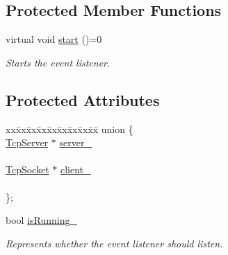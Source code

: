 \subsection*{Protected Member Functions}
\begin{DoxyCompactItemize}
\item 
\mbox{\label{class_tcp_event_listener_a900e4938c19ae2371c4621e5c9d46730}} 
virtual void \mbox{\hyperlink{class_tcp_event_listener_a900e4938c19ae2371c4621e5c9d46730}{start}} ()=0
\begin{DoxyCompactList}\small\item\em Starts the event listener. \end{DoxyCompactList}\end{DoxyCompactItemize}
\subsection*{Protected Attributes}
\begin{DoxyCompactItemize}
\item 
\mbox{\label{class_tcp_event_listener_a2d916c707cc58771608ffdc8ae9dfa13}} 
\begin{tabbing}
xx\=xx\=xx\=xx\=xx\=xx\=xx\=xx\=xx\=\kill
union \{\\
\>\mbox{\hyperlink{class_tcp_server}{TcpServer}} $\ast$ \mbox{\hyperlink{class_tcp_event_listener_ab8e2c46397bc14530531bff274c9d3f1}{server\_}}\\
\>\\
\>\mbox{\hyperlink{class_tcp_socket}{TcpSocket}} $\ast$ \mbox{\hyperlink{class_tcp_event_listener_a17a09698431a0433650c21562dd295ee}{client\_}}\\
\>\\
\}; \\

\end{tabbing}\item 
\mbox{\label{class_tcp_event_listener_a3b623004e10074b2375a3bb7bc9c6c28}} 
bool \mbox{\hyperlink{class_tcp_event_listener_a3b623004e10074b2375a3bb7bc9c6c28}{is\+Running\+\_\+}}
\begin{DoxyCompactList}\small\item\em Represents whether the event listener should listen. \end{DoxyCompactList}\end{DoxyCompactItemize}


